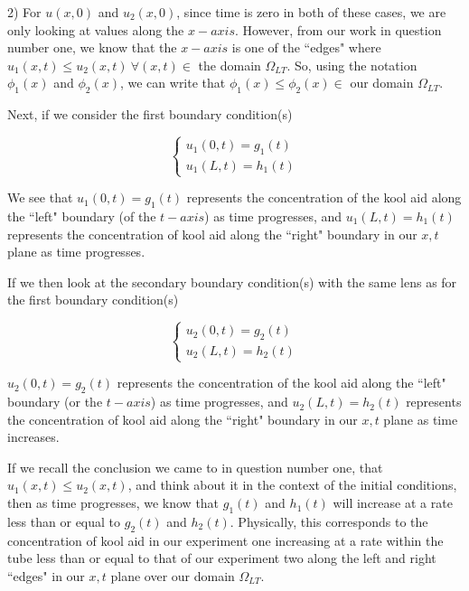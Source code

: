 \documentclass[executivepaper]{article}
\begin{document}
\begin{flushleft}

2) For $u(x,0)$ and $u_{2}(x,0)$, since time is zero in both of these cases, we are only looking at values along the $x-axis$. However, from our work in question number one, we know that the $x-axis$ is one of the ``edges" where $u_{1}(x,t) \leq u_{2}(x,t) {~} \forall (x,t) \in$ the domain $\Omega_{LT}$. So, using the notation $\phi_{1}(x)$ and $\phi_{2}(x)$, we can write that $\phi_{1}(x) \leq \phi_{2}(x) \in$ our domain $\Omega_{LT}$.

\vspace{5mm}

Next, if we consider the first boundary condition(s)

\begin{center}

\[
  \begin{cases} 
   u_{1}(0,t)=g_{1}(t) \\
   u_{1}(L,t)=h_{1}(t)
  \end{cases}
\]

\end{center}

We see that $u_{1}(0,t)=g_{1}(t)$ represents the concentration of the kool aid along the ``left" boundary (of the $t-axis$) as time progresses, and $u_{1}(L,t)=h_{1}(t)$ represents the concentration of kool aid along the ``right" boundary in our $x,t$ plane as time progresses.

\vspace{5mm}

If we then look at the secondary boundary condition(s) with the same lens as for the first boundary condition(s)

\begin{center}

\[
  \begin{cases} 
   u_{2}(0,t)=g_{2}(t) \\
   u_{2}(L,t)=h_{2}(t)
  \end{cases}
\]

\end{center}

$u_{2}(0,t)=g_{2}(t)$ represents the concentration of the kool aid along the ``left" boundary (or the $t-axis$) as time progresses, and $u_{2}(L,t)=h_{2}(t)$ represents the concentration of kool aid along the ``right" boundary in our $x,t$ plane as time increases.

\vspace{5mm}

If we recall the conclusion we came to in question number one, that $u_{1}(x,t) \leq u_{2}(x,t)$, and think about it in the context of the initial conditions, then as time progresses, we know that $g_{1}(t)$ and $h_{1}(t)$ will increase at a rate less than or equal to $g_{2}(t)$ and $h_{2}(t)$. Physically, this corresponds to the concentration of kool aid in our experiment one increasing at a rate within the tube less than or equal to that of our experiment two along the left and right ``edges" in our $x,t$ plane over our domain $\Omega_{LT}$.

\end{flushleft}
\end{document}
